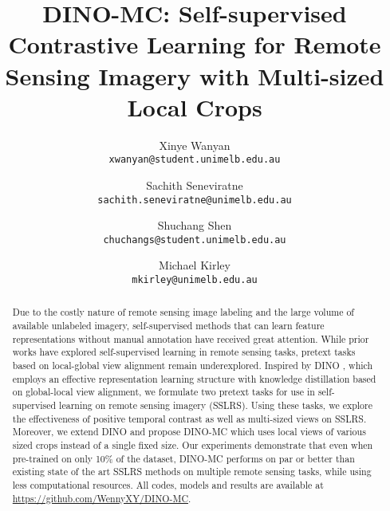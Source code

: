 \documentclass[10pt,twocolumn,letterpaper]{article}
\begin{document}
\title{DINO-MC: Self-supervised Contrastive Learning for Remote Sensing Imagery with Multi-sized Local Crops}

\author{Xinye Wanyan\\
{\tt\small xwanyan@student.unimelb.edu.au}
\and
Sachith Seneviratne\\
{\tt\small sachith.seneviratne@unimelb.edu.au}
\and
Shuchang Shen \\
{\tt\small chuchangs@student.unimelb.edu.au}
\and
Michael Kirley \\
{\tt\small mkirley@unimelb.edu.au}
}
\maketitle

\begin{abstract}
Due to the costly nature of remote sensing image labeling and the large volume of available unlabeled imagery, self-supervised methods that can learn feature representations without manual annotation have received great attention.
While prior works have explored self-supervised learning in remote sensing tasks, pretext tasks based on local-global view alignment remain underexplored.
Inspired by DINO \cite{caron2021emerging}, which employs an effective representation learning structure with knowledge distillation based on global-local view alignment, we formulate two pretext tasks for use in self-supervised learning on remote sensing imagery (SSLRS).
Using these tasks, we explore the effectiveness of positive temporal contrast as well as multi-sized views on SSLRS. 
Moreover, we extend DINO and propose DINO-MC which uses local views of various sized crops instead of a single fixed size.
Our experiments demonstrate that even when pre-trained on only 10\% of the dataset, DINO-MC performs on par or better than existing state of the art SSLRS methods on multiple remote sensing tasks, while using less computational resources.
All codes, models and results are available at 
\url{https://github.com/WennyXY/DINO-MC}.


\end{abstract}
\end{document}
